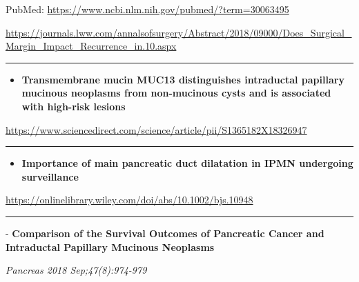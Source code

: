 \documentclass[]{article}
\providecommand{\tightlist}{%
  \setlength{\itemsep}{0pt}\setlength{\parskip}{0pt}}
\begin{document}
PubMed: \url{https://www.ncbi.nlm.nih.gov/pubmed/?term=30063495}

\url{https://journals.lww.com/annalsofsurgery/Abstract/2018/09000/Does_Surgical_Margin_Impact_Recurrence_in.10.aspx}

{}

{}

\begin{center}\rule{0.5\linewidth}{\linethickness}\end{center}

\begin{itemize}
\tightlist
\item
  \textbf{Transmembrane mucin MUC13 distinguishes intraductal papillary
  mucinous neoplasms from non-mucinous cysts and is associated with
  high-risk lesions}
\end{itemize}

\url{https://www.sciencedirect.com/science/article/pii/S1365182X18326947}

\begin{center}\rule{0.5\linewidth}{\linethickness}\end{center}

\begin{itemize}
\tightlist
\item
  \textbf{Importance of main pancreatic duct dilatation in IPMN
  undergoing surveillance}
\end{itemize}

\url{https://onlinelibrary.wiley.com/doi/abs/10.1002/bjs.10948}

\begin{center}\rule{0.5\linewidth}{\linethickness}\end{center}

 - \textbf{Comparison of the Survival Outcomes of Pancreatic Cancer and
Intraductal Papillary Mucinous Neoplasms}

\emph{Pancreas 2018 Sep;47(8):974-979}
\end{document}
